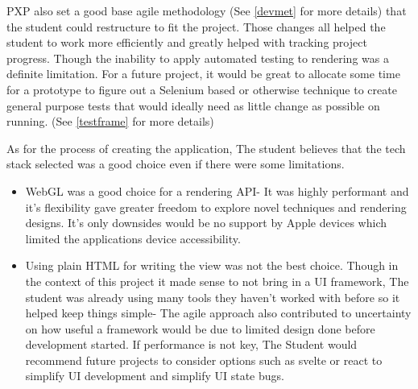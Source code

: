 PXP also set a good base agile methodology (See \ref{devmet} for more details) that the student could restructure to fit the project. Those changes all helped the student to work more efficiently and greatly helped with tracking project progress. Though the inability to apply automated testing to rendering was a definite limitation. For a future project, it would be great to allocate some time for a prototype to figure out a Selenium based or otherwise technique to create general purpose tests that would ideally need as little change as possible on running. (See \ref{testframe} for more details)

As for the process of creating the application, The student believes that the tech stack selected was a good choice even if there were some limitations.
\begin{itemize}
    \item WebGL was a good choice for a rendering API- It was highly performant and it's flexibility gave greater freedom to explore novel techniques and rendering designs. It's only downsides would be no support by Apple devices \cite[]{apple_metal} which limited the applications device accessibility.
    \item Using plain HTML for writing the view was not the best choice. Though in the context of this project it made sense to not bring in a UI framework, The student was already using many tools they haven't worked with before so it helped keep things simple- The agile approach also contributed to uncertainty on how useful a framework would be due to limited design done before development started. If performance is not key, The Student would recommend future projects to consider options such as svelte or react to simplify UI development and simplify UI state bugs.
\end{itemize}


